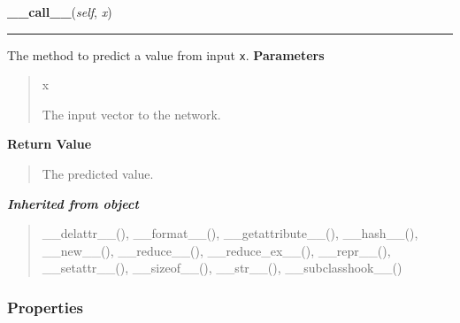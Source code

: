\hspace{.8\funcindent}\begin{boxedminipage}{\funcwidth}

    \raggedright \textbf{\_\_call\_\_}(\textit{self}, \textit{x})

    \vspace{-1.5ex}

    \rule{\textwidth}{0.5\fboxrule}
\setlength{\parskip}{2ex}

The method to predict a value from input \texttt{x}.
\setlength{\parskip}{1ex}
      \textbf{Parameters}
      \vspace{-1ex}

      \begin{quote}
        \begin{Ventry}{x}

          \item[x]


The input vector to the network.
        \end{Ventry}

      \end{quote}

      \textbf{Return Value}
    \vspace{-1ex}

      \begin{quote}

The predicted value.
      \end{quote}

    \end{boxedminipage}


\large{\textbf{\textit{Inherited from object}}}

\begin{quote}
\_\_delattr\_\_(), \_\_format\_\_(), \_\_getattribute\_\_(), \_\_hash\_\_(), \_\_new\_\_(), \_\_reduce\_\_(), \_\_reduce\_ex\_\_(), \_\_repr\_\_(), \_\_setattr\_\_(), \_\_sizeof\_\_(), \_\_str\_\_(), \_\_subclasshook\_\_()
\end{quote}


  \subsubsection{Properties}

